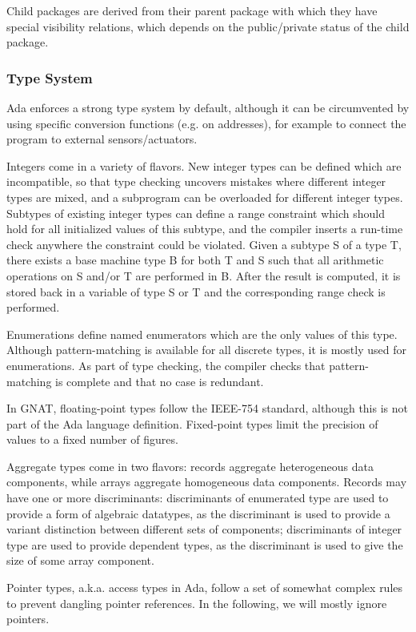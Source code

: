 \documentclass{article}
\newcounter{example}
\begin{document}
Child packages are derived from their parent package with which they have
special visibility relations, which depends on the public/private status of the
child package.

\subsubsection{Type System}

Ada enforces a strong type system by default, although it can be circumvented
by using specific conversion functions (e.g. on addresses), for example to
connect the program to external sensors/actuators.

Integers come in a variety of flavors. New integer types can be defined which
are incompatible, so that type checking uncovers mistakes where different
integer types are mixed, and a subprogram can be overloaded for different
integer types. Subtypes of existing integer types can define a range constraint
which should hold for all initialized values of this subtype, and the compiler
inserts a run-time check anywhere the constraint could be violated. Given a
subtype S of a type T, there exists a base machine type B for both T and S such
that all arithmetic operations on S and/or T are performed in B.  After the
result is computed, it is stored back in a variable of type S or T and the
corresponding range check is performed.

Enumerations define named enumerators which are the only values of this
type. Although pattern-matching is available for all discrete types, it is
mostly used for enumerations. As part of type checking, the compiler checks
that pattern-matching is complete and that no case is redundant.

In GNAT, floating-point types follow the IEEE-754 standard, although this is
not part of the Ada language definition. Fixed-point types limit the precision
of values to a fixed number of figures.

Aggregate types come in two flavors: records aggregate heterogeneous data
components, while arrays aggregate homogeneous data components. Records may
have one or more discriminants: discriminants of enumerated type are used to
provide a form of algebraic datatypes, as the discriminant is used to provide a
variant distinction between different sets of components; discriminants of
integer type are used to provide dependent types, as the discriminant is used
to give the size of some array component.

Pointer types, a.k.a. access types in Ada, follow a set of somewhat complex
rules to prevent dangling pointer references. In the following, we will mostly
ignore pointers.
\end{document}

